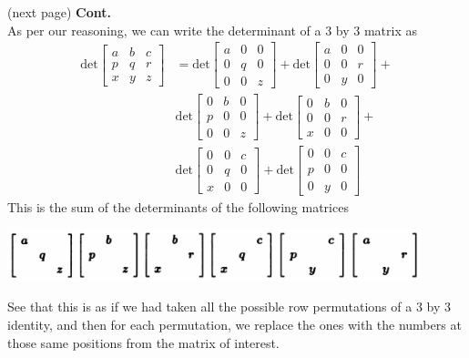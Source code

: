 \documentclass{report}
\begin{document}
(next page)\newpage
\noindent\textbf{Cont.}\\
As per our reasoning, we can write the determinant of a 3 by 3 matrix as
\begin{align*}
\text{det}\left[\begin{array}{ccc}
a&b&c\\
p&q&r\\
x&y&z
\end{array}\right]&
=\text{det}\left[\begin{array}{ccc}
a&0&0\\
0&q&0\\
0&0&z
\end{array}\right]+
\text{det}\left[\begin{array}{ccc}
a&0&0\\
0&0&r\\
0&y&0
\end{array}\right]+\\
&\text{det}\left[\begin{array}{ccc}
0&b&0\\
p&0&0\\
0&0&z
\end{array}\right]+
\text{det}\left[\begin{array}{ccc}
0&b&0\\
0&0&r\\
x&0&0
\end{array}\right]+\\
&\text{det}\left[\begin{array}{ccc}
0&0&c\\
0&q&0\\
x&0&0
\end{array}\right]+
\text{det}\left[\begin{array}{ccc}
0&0&c\\
p&0&0\\
0&y&0
\end{array}\right]
\end{align*}
This is the sum of the determinants of the following matrices 
\begin{center}
\includegraphics[width=12cm]{98}
\end{center}
See that this is as if we had taken all the possible row permutations of 
a 3 by 3 identity, and then for each permutation, we replace the ones with the numbers at those same positions from the matrix of interest. 
\end{document}
